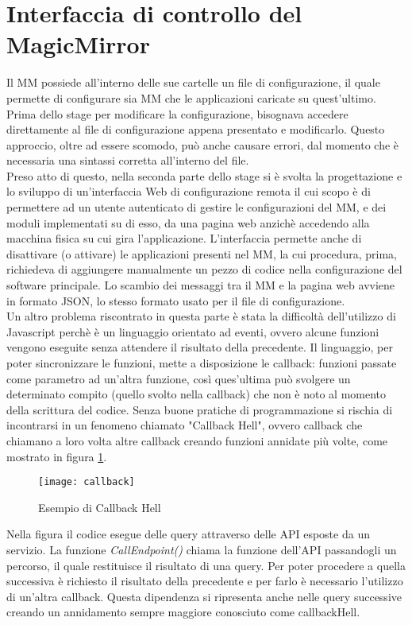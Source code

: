 \section{Interfaccia di controllo del MagicMirror}\label{cap:interfacciaproblemi}
Il MM possiede all'interno delle sue cartelle un file di configurazione, il quale permette
di configurare sia MM che le applicazioni caricate su quest'ultimo.
Prima dello stage per modificare la configurazione, bisognava accedere direttamente al file di configurazione
appena presentato e modificarlo. Questo approccio, oltre ad essere scomodo, pu\`o anche
causare errori, dal momento che \`e necessaria una sintassi corretta all'interno del file.\\[1\baselineskip]
Preso atto di questo, nella seconda parte dello stage si \`e svolta la progettazione e lo sviluppo di un'interfaccia Web di configurazione remota
il cui scopo \`e di permettere ad un utente autenticato di gestire
le configurazioni del MM, e dei moduli implementati su di esso, da una pagina web
anzich\`e accedendo alla macchina fisica su cui gira l'applicazione.
L'interfaccia permette anche di disattivare (o attivare) le applicazioni presenti nel MM,
la cui procedura, prima, richiedeva di aggiungere manualmente un pezzo di codice nella
configurazione del software principale.
Lo scambio dei messaggi tra il MM e la pagina web avviene in formato JSON, lo stesso formato
usato per il file di configurazione.\\
Un altro problema riscontrato in questa parte \`e stata la difficolt\`a dell'utilizzo di Javascript
perch\`e \`e un linguaggio orientato ad eventi, ovvero alcune funzioni vengono eseguite senza attendere
il risultato della precedente. Il linguaggio, per poter sincronizzare le funzioni, mette a disposizione
le callback: funzioni passate come parametro ad un'altra funzione, così
ques'ultima pu\`o svolgere un determinato compito (quello svolto nella callback) che non \`e noto al momento
della scrittura del codice.
Senza buone pratiche di programmazione si rischia di incontrarsi in un fenomeno chiamato "Callback Hell", ovvero callback che chiamano a loro volta
altre callback creando funzioni annidate pi\`u volte, come mostrato in figura \ref{fig:hell}.
\begin{figure}[H]
    \texttt{[image: callback]}
    \caption{Esempio di Callback Hell}
    \label{fig:hell}
\end{figure}
Nella figura il codice esegue delle query attraverso delle API esposte da un servizio. La funzione \textit{CallEndpoint()} chiama la funzione dell'API passandogli
un percorso, il quale restituisce il risultato di una query. Per poter procedere a quella successiva \`e richiesto il risultato della precedente e
per farlo \`e necessario l'utilizzo di un'altra callback. Questa dipendenza si ripresenta anche nelle query successive creando un annidamento
sempre maggiore conosciuto come callbackHell.
